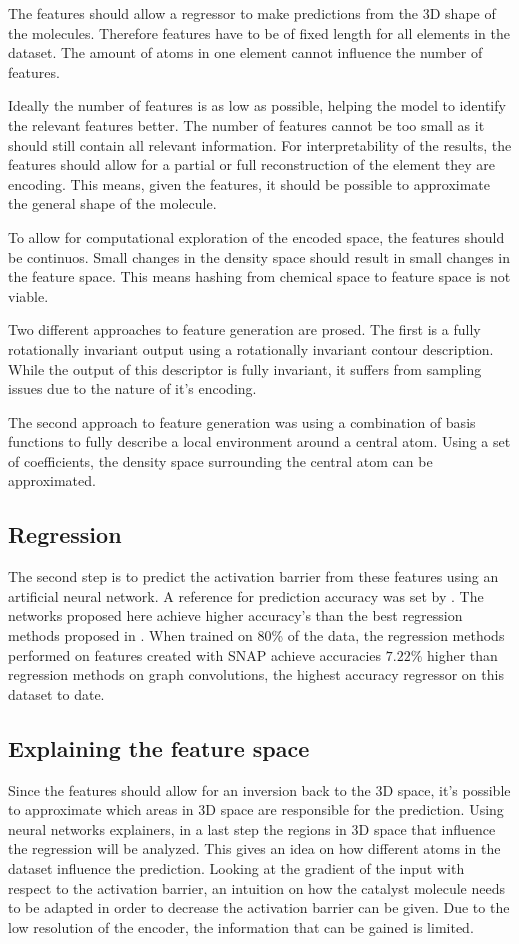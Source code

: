 The features should allow a regressor to make predictions from the 3D shape of the molecules.
Therefore features have to be of fixed length for all elements in the dataset.
The amount of atoms in one element cannot influence the number of features.

Ideally the number of features is as low as possible, helping the model to identify the relevant features better.
The number of features cannot be too small as it should still contain all relevant information.
For interpretability of the results, the features should allow for a partial or full reconstruction of the element they are encoding.
This means, given the features, it should be possible to approximate the general shape of the molecule.

To allow for computational exploration of the encoded space, the features should be continuos.
Small changes in the density space should result in small changes in the 
feature space. 
This means hashing from chemical space to feature space is not viable.

Two different approaches to feature generation are prosed.
The first is a fully rotationally invariant output using a rotationally invariant contour description.
While the output of this descriptor is fully invariant, it suffers from sampling issues due to the nature of it's encoding.

The second approach to feature generation was using a combination of basis functions to fully describe a local environment around a central atom.
Using a set of coefficients, the density space surrounding the central atom can be approximated.

\subsection{Regression}

The second step is to predict the activation barrier from these features using an artificial neural network.
A reference for prediction accuracy was set by \cite{friederich_dos}.
The networks proposed here achieve higher accuracy's than the best regression methods proposed in \cite{friederich_dos}.
When trained on 80\% of the data, the regression methods performed on features created with SNAP achieve accuracies $7.22\%$ higher than regression methods on graph convolutions,
the highest accuracy regressor on this dataset to date.

\subsection{Explaining the feature space}
Since the features should allow for an inversion back to the 3D space, it's possible to approximate which areas in 3D space are responsible for the prediction.
Using neural networks explainers, in  a last step the regions in 3D space that influence the regression will be analyzed.
This gives an idea on how different atoms in the dataset influence the prediction.
Looking at the gradient of the input with respect to the activation barrier, an intuition on how the catalyst molecule needs to be 
adapted in order to decrease the activation barrier can be given.
Due to the low resolution of the encoder, the information that can be gained is limited.
